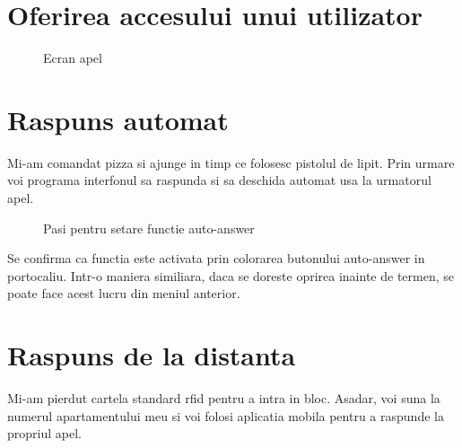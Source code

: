 \section{Oferirea accesului unui utilizator}

\begin{figure}[H]
\begin{center}
  \hfil
  \caption{Ecran apel}
  \label{fig:useraddg}
\end{center}
\end{figure}


\section{Raspuns automat}

Mi-am comandat pizza si ajunge in timp ce folosesc pistolul de lipit. Prin urmare voi programa interfonul sa raspunda si sa deschida automat usa la urmatorul apel.

\begin{figure}[H]
\begin{center}
  \hfil
  \caption{Pasi pentru setare functie auto-answer}
  \label{fig:autoanswer}
\end{center}
\end{figure}

Se confirma ca functia este activata prin colorarea butonului auto-answer in portocaliu. Intr-o maniera similiara, daca se doreste oprirea inainte de termen, se poate face acest lucru din meniul anterior.

\section{Raspuns de la distanta}

Mi-am pierdut cartela standard \acrfull{rfid} pentru a intra in bloc. Asadar, voi suna la numerul apartamentului meu si voi folosi aplicatia mobila pentru a raspunde la propriul apel.

